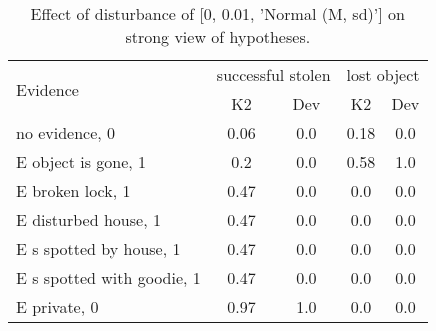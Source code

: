 \begin{table}\begin{tabular}{l|cc|cc}\toprule\multirow{2}{*}{Evidence} & \multicolumn{2}{c}{successful stolen}& \multicolumn{2}{c}{lost object}\\& {K2} & {Dev}& {K2} & {Dev}\\\midrule
no evidence, 0 & \cellcolor{Bittersweet}0.06&\cellcolor{Bittersweet}0.0&\cellcolor{Bittersweet}0.18&\cellcolor{Bittersweet}0.0\\E object is gone, 1 & \cellcolor{Bittersweet}0.2&\cellcolor{Bittersweet}0.0&0.58&1.0\\E broken lock, 1 & 0.47&0.0&\cellcolor{Bittersweet}0.0&\cellcolor{Bittersweet}0.0\\E disturbed house, 1 & 0.47&0.0&\cellcolor{Bittersweet}0.0&\cellcolor{Bittersweet}0.0\\E s spotted by house, 1 & 0.47&0.0&\cellcolor{Bittersweet}0.0&\cellcolor{Bittersweet}0.0\\E s spotted with goodie, 1 & 0.47&0.0&\cellcolor{Bittersweet}0.0&\cellcolor{Bittersweet}0.0\\E private, 0 & \cellcolor{Bittersweet}0.97&\cellcolor{Bittersweet}1.0&\cellcolor{Bittersweet}0.0&\cellcolor{Bittersweet}0.0\\\bottomrule\end{tabular}\caption{Effect of disturbance of [0, 0.01, 'Normal (M, sd)'] on strong view of hypotheses.}\end{table}